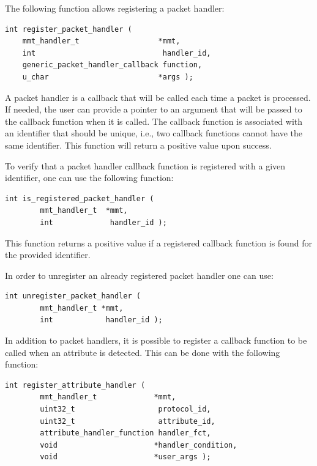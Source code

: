 The following function allows registering a packet handler:

\begin{lstlisting}[style=Cpp]
int register_packet_handler (
    mmt_handler_t                  *mmt,
    int                             handler_id,
    generic_packet_handler_callback function,
    u_char                         *args );
\end{lstlisting}

A packet handler is a callback that will be called each time a packet is processed. If needed, the user can provide a pointer to an argument that will be passed to the callback function when it is called. The callback function is associated with an identifier that should be unique, i.e., two callback functions cannot have the same identifier. This function will return a positive value upon success.

To verify that a packet handler callback function is registered with a given identifier, one can use the following function:

\begin{lstlisting}[style=Cpp]
int is_registered_packet_handler (
        mmt_handler_t  *mmt,
        int             handler_id );
\end{lstlisting}




This function returns a positive value if a registered callback function is found for the provided identifier.




In order to unregister an already registered packet handler one can use:




\begin{lstlisting}[style=Cpp]
int unregister_packet_handler (
        mmt_handler_t *mmt,
        int            handler_id );
\end{lstlisting}




In addition to packet handlers, it is possible to register a callback function to be called when an attribute is detected. This can be done with the following function:




\begin{lstlisting}[style=Cpp]
int register_attribute_handler (
        mmt_handler_t             *mmt,
        uint32_t                   protocol_id,
        uint32_t                   attribute_id,
        attribute_handler_function handler_fct,
        void                      *handler_condition,
        void                      *user_args );
\end{lstlisting}




